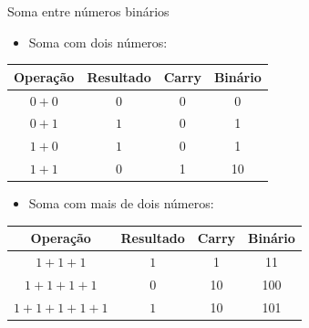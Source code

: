 
\begin{frame}{Soma entre números binários}
    \begin{itemize}
        \item Soma com dois números:
    \end{itemize}
    \begin{table}[h]
        \centering
        \begin{tabular}{c|c|c|c}
            \hline
            \textbf{Operação} & \textbf{Resultado} & \textbf{Carry} & \textbf{Binário} \\
            \hline
            $0 + 0$         & $0$    & 0        & 0     \\
            $0 + 1$         & $1$    & 0        & 1     \\
            $1 + 0$         & $1$    & 0        & 1     \\
            $1 + 1$         & $0$    & 1        & 10    \\
            \hline
        \end{tabular}
    \end{table}
    \begin{itemize}
        \item Soma com mais de dois números:
    \end{itemize}
    \begin{table}[h]
        \centering
        \begin{tabular}{c|c|c|c}
            \hline
            \textbf{Operação} & \textbf{Resultado} & \textbf{Carry} & \textbf{Binário} \\
            \hline
            $1 + 1 + 1$         & $1$    & 1        & 11    \\
            $1 + 1 + 1 + 1$     & $0$    & 10       & 100   \\
            $1 + 1 + 1 + 1 + 1$ & $1$    & 10       & 101   \\
            \hline
        \end{tabular}
    \end{table}
\end{frame}